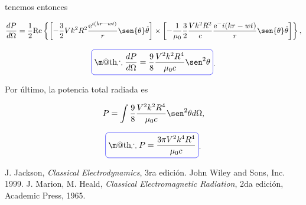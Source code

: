 \documentclass[a4paper,11pt]{article}
\makeatletter
\numberwithin{equation}{section}
\newcommand*{\boxcolor}{blue}
\renewcommand{\boxed}[1]{\textcolor{\boxcolor}{%
\tikz[baseline={([yshift=-1ex]current bounding box.center)}] \node [rectangle, minimum width=1ex,rounded corners,draw] {\normalcolor\m@th$\displaystyle#1$};}}
\newcommand{\euler}{\mathrm{e}}
\makeatother
\begin{document}
tenemos entonces 

\begin{equation}
 \frac{dP}{d\Omega} = \frac{1}{2} \text{Re}\left\{\left[- \frac{3}{2}Vk^2R^2 
 \frac{\euler^{i(kr - wt)}}{r}\sen{\theta} \hat{\theta}\right] \times 
 \left[- \frac{1}{\mu_0} \frac{3}{2} \frac{V k^2 R^2}{c} \frac{\euler^-{i(kr - wt)}}{r}
 \sen{\theta} \hat{\theta}\right]\right\},
\end{equation}

\begin{equation}
 \boxed{\therefore \frac{dP}{d\Omega} = \frac{9}{8}\frac{V^2k^2R^4}{\mu_0c}
 \sen^2{\theta}}.
\end{equation}

Por último, la potencia total radiada es 

\begin{equation}
 P = \int  \frac{9}{8}\frac{V^2k^2R^4}{\mu_0c} \sen^2{\theta} d\Omega,
\end{equation}

\begin{equation}
 \boxed{\therefore P = \frac{3\pi V^2 k^4 R^4}{\mu_0 c}}.
\end{equation}

\begin{thebibliography}{10}
J. Jackson, \emph{Classical Electrodynamics}, 3ra edición. John Wiley and Sons, Inc. 
1999.
J. Marion, M. Heald, \emph{Classical Electromagnetic Radiation}, 2da edición, Academic 
Press, 1965.
\end{thebibliography}
\end{document}

